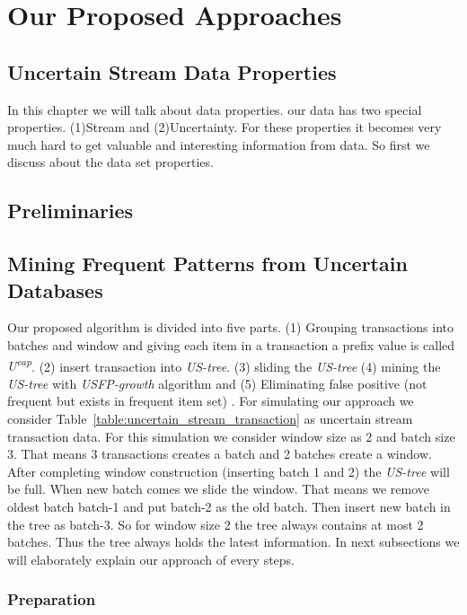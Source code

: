 \documentclass[a4paper,12pt]{book}
\begin{document}
\chapter{Our Proposed Approaches}

\section{Uncertain Stream Data Properties}
In this chapter we will talk about data properties. our data has two special properties. (1)Stream and (2)Uncertainty. For these properties it becomes very much hard to get valuable and interesting information from data. So first we discuss about the data set properties.


\newpage
\section{Preliminaries}


\section{Mining Frequent Patterns from Uncertain Databases}
Our proposed algorithm is divided into five parts. (1) Grouping transactions into batches and window and giving each item in a transaction a prefix value is called \emph{U\textsuperscript{cap}}. (2) insert transaction into \emph {US-tree}. (3) sliding the \emph {US-tree} (4) mining the \emph {US-tree} with \emph{USFP-growth} algorithm and (5) Eliminating false positive (not frequent but exists in frequent item set) . For simulating our approach we consider Table~\ref{table:uncertain_stream_transaction} as uncertain stream transaction data. For this simulation we consider window size as 2 and batch size 3. That means 3 transactions creates a batch and 2 batches create a window. After completing window construction (inserting batch 1 and 2) the \emph {US-tree} will be full. When new batch comes we slide the window. That means we remove oldest batch batch-1 and put batch-2 as the old batch. Then insert new batch in the tree as batch-3. So for window size 2 the tree always contains at most 2 batches. Thus the tree always holds the latest information. In next subsections we will elaborately explain our approach of every steps.
\subsection{Preparation}


\end{document}
